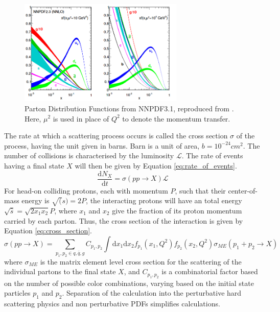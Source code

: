 \documentclass[11pt,a4paper,openright,twoside]{report}
\begin{document}
\begin{figure}[h]
\centering
\includegraphics[width=0.7\textwidth]{NNPDF3.png}
\caption{Parton Distribution Functions from NNPDF3.1, reproduced from \cite{NNPDF}. Here, $\mu^2$ is used in place of $Q^2$ to denote the momentum transfer.}
\label{fig:NNPDF3}
\end{figure}

The rate at which a scattering process occurs is called the cross section $\sigma$ of the process, having the unit given in barns. Barn is a unit of area, $b = 10^{-24}cm^2$. The number of collisions is characterised by the luminosity $\mathcal{L}$. The rate of events having a final state $X$ will then be given by Equation \ref{eq:rate_of_events}.
\begin{equation}
\frac{\text{d}N_X}{\text{d}t} = \sigma(pp\to X)\mathcal{L}
\label{eq:rate_of_events}
\end{equation}
For head-on colliding protons, each with momentum $P$, such that their center-of-mass energy is $\sqrt(s)=2P$, the interacting protons will have an total energy $\sqrt{\hat{s}}=\sqrt{2x_1x_2}P$, where $x_1$ and $x_2$ give the fraction of its proton momentum carried by each parton. Thus, the cross section of the interaction is given by Equation \ref{eq:cross_section}.
\begin{equation}
\sigma(pp\to X) = \sum_{p_1,p_2\in q,\bar{q},g} C_{p_1,p_2}\int\text{d}x_1\text{d}x_2 f_{p_1}(x_1,Q^2)f_{p_2}(x_2,Q^2)\sigma_{ME}(p_1+p_2\to X)
\label{eq:cross_section}
\end{equation}
where $\sigma_{ME}$ is the matrix element level cross section for the scattering of the individual partons to the final state $X$, and $C_{p_1,p_2}$ is a combinatorial factor based on the number of possible color combinations, varying based on the initial state particles $p_1$ and $p_2$. Separation of the calculation into the perturbative hard scattering physics and non perturbative PDFs simplifies calculations.
\end{document}
